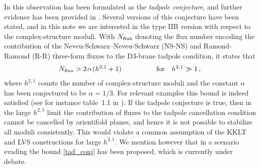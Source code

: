 \documentclass[12pt,a4paper]{article}
\newcommand{\eq}[1]{\begin{equation}
                     \begin{split} #1 \end{split}
                     \end{equation}}
\newcommand{\op}{\hspace{1pt}}
\numberwithin{equation}{section}
\begin{document}
In \cite{Bena:2020xrh} this observation has been formulated as the \textit{tadpole conjecture}, 
and further evidence has been 
provided in \cite{Bena:2021wyr}. 
Several versions of this conjecture have been stated, and 
in this note  we are interested in the type IIB version with respect to the complex-structure 
moduli. 
With $N_{\rm flux}$ denoting the flux number encoding the contribution of 
the Neveu-Schwarz--Neveu-Schwarz (NS-NS) and Ramond-Ramond (R-R) three-form fluxes
to the D3-brane tadpole  condition, 
it states that
\eq{
  \label{tad_conj}
   N_{\rm flux}  > 2\op\alpha\op (h^{2,1}+1)
  \hspace{50pt} \mbox{for}\quad h^{2,1}\gg 1\,,
}
where 
$h^{2,1}$ counts the number of complex-structure moduli and
the constant $\alpha$ has been conjectured to be $\alpha=1/3$. 
For relevant examples  this bound is indeed satisfied (see for instance 
table~1.1 in \cite{Bena:2020xrh}).
If the tadpole  conjecture is true, then in the large $h^{2,1}$ limit 
the contribution of  fluxes to the tadpole cancellation condition cannot 
be cancelled by orientifold planes, and hence it is not possible 
to stabilize all moduli consistently. 
This would violate a common assumption of the KKLT and 
LVS constructions for large $h^{2,1}$.
We mention however that in \cite{Marchesano:2021gyv} a scenario 
evading the bound \eqref{tad_conj} has been proposed, which 
is currently under debate. 
\end{document}
